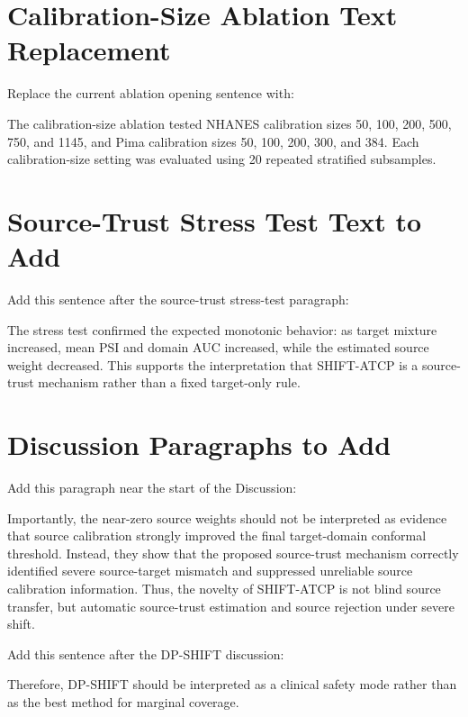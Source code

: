 \documentclass[11pt]{article}
\begin{document}
\section{Calibration-Size Ablation Text Replacement}
Replace the current ablation opening sentence with:

The calibration-size ablation tested NHANES calibration sizes 50, 100, 200, 500, 750, and 1145, and Pima calibration sizes 50, 100, 200, 300, and 384. Each calibration-size setting was evaluated using 20 repeated stratified subsamples.

\section{Source-Trust Stress Test Text to Add}
Add this sentence after the source-trust stress-test paragraph:

The stress test confirmed the expected monotonic behavior: as target mixture increased, mean PSI and domain AUC increased, while the estimated source weight decreased. This supports the interpretation that SHIFT-ATCP is a source-trust mechanism rather than a fixed target-only rule.

\section{Discussion Paragraphs to Add}
Add this paragraph near the start of the Discussion:

Importantly, the near-zero source weights should not be interpreted as evidence that source calibration strongly improved the final target-domain conformal threshold. Instead, they show that the proposed source-trust mechanism correctly identified severe source-target mismatch and suppressed unreliable source calibration information. Thus, the novelty of SHIFT-ATCP is not blind source transfer, but automatic source-trust estimation and source rejection under severe shift.

Add this sentence after the DP-SHIFT discussion:

Therefore, DP-SHIFT should be interpreted as a clinical safety mode rather than as the best method for marginal coverage.
\end{document}
